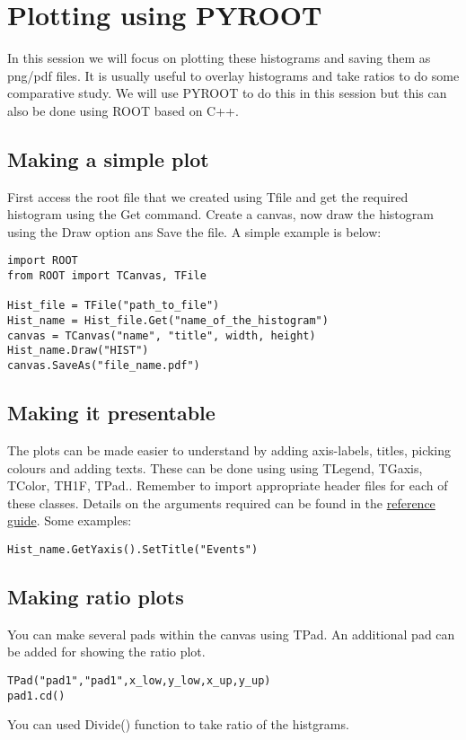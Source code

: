 \documentclass[letterpaper,12pt]{article}
\begin{document}
\section{Plotting using PYROOT}

In this session we will focus on plotting these histograms and saving them as png/pdf files. It is usually useful to overlay histograms and take ratios to do some comparative study. We will use PYROOT to do this in this session but this can also be done using ROOT based on C++. 

\subsection{Making a simple plot}
First access the root file that we created using Tfile and get the required histogram using the Get command. Create a canvas, now draw the histogram using the Draw option ans Save the file. A simple example is below:

\begin{lstlisting}
import ROOT
from ROOT import TCanvas, TFile

Hist_file = TFile("path_to_file")
Hist_name = Hist_file.Get("name_of_the_histogram")
canvas = TCanvas("name", "title", width, height)
Hist_name.Draw("HIST")
canvas.SaveAs("file_name.pdf")

\end{lstlisting}

\subsection{Making it presentable}
The plots can be made easier to understand by adding axis-labels, titles, picking colours and adding texts. These can be done using  using TLegend, TGaxis, TColor, TH1F, TPad.. Remember to import appropriate header files for each of these classes. 
Details on the arguments required can be found in the \href{https://root.cern/doc/master/}{reference guide}. Some examples:

\begin{lstlisting}
Hist_name.GetYaxis().SetTitle("Events")
\end{lstlisting}

\subsection{Making ratio plots}
You can make several pads within the canvas using TPad. An additional pad can be added for showing the ratio plot. 
\begin{lstlisting}
TPad("pad1","pad1",x_low,y_low,x_up,y_up)
pad1.cd()
\end{lstlisting} 
You can used Divide() function to take ratio of the histgrams.
\end{document}
